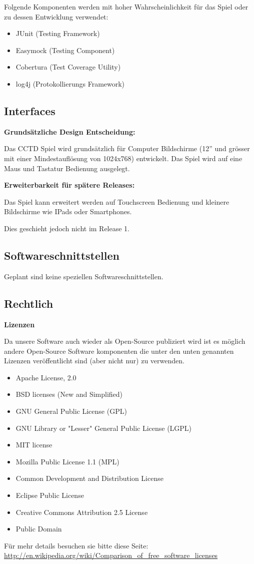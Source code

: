 Folgende Komponenten werden mit hoher Wahrscheinlichkeit für das Spiel oder zu dessen Entwicklung verwendet:
\begin{itemize}
\item JUnit (Testing Framework)
\item Easymock (Testing Component)
\item Cobertura (Test Coverage Utility)
\item log4j (Protokollierungs Framework)
\end{itemize}
\subsection{Interfaces}
\textbf{Grundsätzliche Design Entscheidung:}

Das CCTD Spiel wird grundsätzlich für Computer Bildschirme (12''  und grösser mit einer Mindestauflösung von 1024x768) entwickelt.
Das Spiel wird auf eine Maus und Tastatur Bedienung ausgelegt.

\textbf{Erweiterbarkeit für spätere Releases:}

Das Spiel kann erweitert werden auf Touchscreen Bedienung und kleinere Bildschirme wie IPads oder Smartphones. 

Dies geschieht jedoch nicht im Release 1.
\subsection{Softwareschnittstellen}
Geplant sind keine speziellen Softwareschnittstellen.
\subsection{Rechtlich}

\textbf{Lizenzen}

Da unsere Software auch wieder als Open-Source publiziert wird ist es möglich andere Open-Source Software komponenten die unter den unten genannten Lizenzen veröffentlicht sind (aber nicht nur) zu verwenden. 

\begin{itemize}
\item Apache License, 2.0
\item BSD licenses (New and Simplified)
\item GNU General Public License (GPL)
\item GNU Library or "Lesser" General Public License (LGPL)
\item MIT license
\item Mozilla Public License 1.1 (MPL)
\item Common Development and Distribution License
\item Eclipse Public License
\item Creative Commons Attribution 2.5 License
\item Public Domain
\end{itemize}

Für mehr details besuchen sie bitte diese Seite: \url{http://en.wikipedia.org/wiki/Comparison_of_free_software_licenses}
